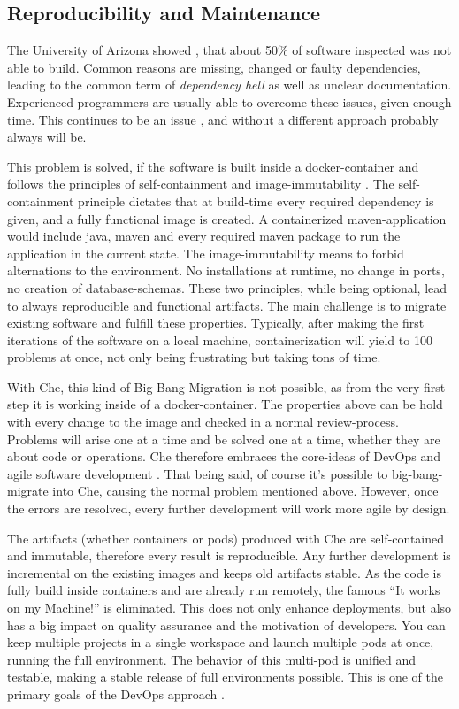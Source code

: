 \documentclass[english,utf8]{lni}
\begin{document}
\subsection{Reproducibility and Maintenance}
The University of Arizona showed \cite{CO16}, that about 50\% of software inspected was not able to build. 
Common reasons are missing, changed or faulty dependencies, leading to the common term of \textit{dependency hell} as well as unclear documentation. 
Experienced programmers are usually able to overcome these issues, given enough time. This continues to be an issue \cite{CL14}, and without a different approach probably always will be. 

This problem is solved, if the software is built inside a docker-container and follows the principles of self-containment and image-immutability \cite{BI17}.
The self-containment principle dictates that  at build-time every required dependency is given, and a fully functional image is created.
A containerized maven-application would include java, maven and every required maven package to run the application in the current state. 
The image-immutability means to forbid alternations to the environment. 
No installations at runtime, no change in ports, no creation of database-schemas.
These two principles, while being optional, lead to always reproducible and functional artifacts.
The main challenge is to migrate existing software and fulfill these properties. 
Typically, after making the first iterations of the software on a local machine, containerization will yield to 100 problems at once, not only being frustrating but taking tons of time. 

With Che, this kind of Big-Bang-Migration is not possible, as from the very first step it is working inside of a docker-container.
The properties above can be hold with every change to the image and checked in a normal review-process. 
Problems will arise one at a time and be solved one at a time, whether they are about code or operations. 
Che therefore embraces the core-ideas of DevOps \cite{JA16} and agile software development \cite{EBE16}.
That being said, of course it's possible to big-bang-migrate into Che, causing the normal problem mentioned above. 
However, once the errors are resolved, every further development will work more agile by design.

The artifacts (whether containers or pods) produced with Che are self-contained and immutable, therefore every result is reproducible. 
Any further development is incremental on the existing images and keeps old artifacts stable. 
As the code is fully build inside containers and are already run remotely, the famous “It works on my Machine!” is eliminated. 
This does not only enhance deployments, but also has a big impact on quality assurance and the motivation of developers. 
You can keep multiple projects in a single workspace and launch multiple pods at once, running the full environment. 
The behavior of this multi-pod is unified and testable, making a stable release of full environments possible. 
This is one of the primary goals of the DevOps approach \cite{JA16}. 
\newpage
\end{document}
